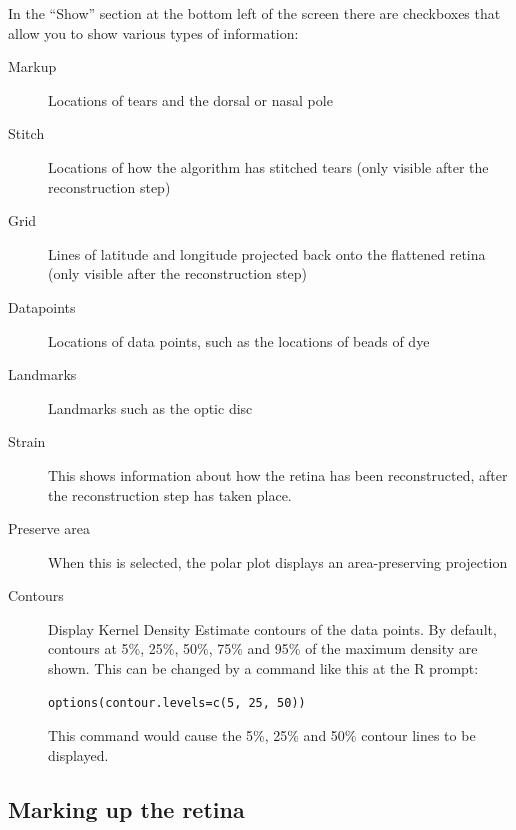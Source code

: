 \documentclass{article}
\begin{document}
In the ``Show'' section at the bottom left of the screen there are
checkboxes that allow you to show various types of information:
\begin{description}
\item[Markup] Locations of tears and the dorsal or nasal pole
\item[Stitch] Locations of how the algorithm has stitched tears (only
  visible after the reconstruction step)
\item[Grid] Lines of latitude and longitude projected back onto the
  flattened retina (only visible after the reconstruction step)
\item[Datapoints] Locations of data points, such as the locations of
  beads of dye
\item[Landmarks] Landmarks such as the optic disc
\item[Strain] This shows information about how the retina has been
  reconstructed, after the reconstruction step has taken place.
\item[Preserve area] When this is selected, the polar plot displays an
  area-preserving projection
\item[Contours] Display Kernel Density Estimate contours of the data
  points. By default, contours at 5\%, 25\%, 50\%, 75\% and 95\% of the maximum
  density are shown. This can be changed by a command like this at the
  R prompt:
\begin{verbatim}
options(contour.levels=c(5, 25, 50))
\end{verbatim}
  This command would cause the 5\%, 25\% and 50\% contour lines to be
  displayed.
\end{description}

\subsection{Marking up the retina}
\label{manual:sec:opening-files-retina}
\end{document}
